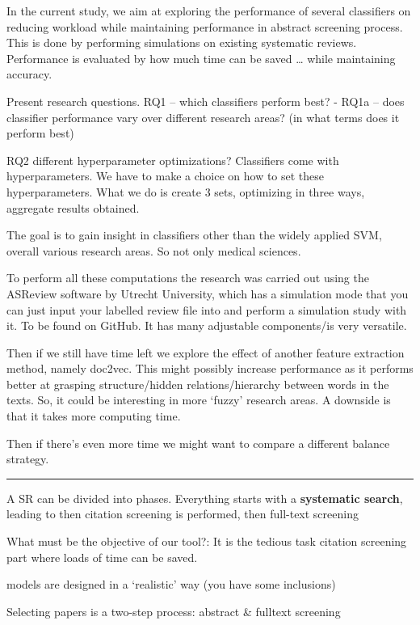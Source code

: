\documentclass[
]{article}
\begin{document}
In the current study, we aim at exploring the performance of several
classifiers on reducing workload while maintaining performance in
abstract screening process. This is done by performing simulations on
existing systematic reviews. Performance is evaluated by how much time
can be saved \ldots{} while maintaining accuracy.

Present research questions. RQ1 -- which classifiers perform best? -
RQ1a -- does classifier performance vary over different research areas?
(in what terms does it perform best)

RQ2 different hyperparameter optimizations? Classifiers come with
hyperparameters. We have to make a choice on how to set these
hyperparameters. What we do is create 3 sets, optimizing in three ways,
aggregate results obtained.

The goal is to gain insight in classifiers other than the widely applied
SVM, overall various research areas. So not only medical sciences.

To perform all these computations the research was carried out using the
ASReview software by Utrecht University, which has a simulation mode
that you can just input your labelled review file into and perform a
simulation study with it. To be found on GitHub. It has many adjustable
components/is very versatile.

Then if we still have time left we explore the effect of another feature
extraction method, namely doc2vec. This might possibly increase
performance as it performs better at grasping structure/hidden
relations/hierarchy between words in the texts. So, it could be
interesting in more `fuzzy' research areas. A downside is that it takes
more computing time.

Then if there's even more time we might want to compare a different
balance strategy.

\begin{center}\rule{0.5\linewidth}{0.5pt}\end{center}

A SR can be divided into phases. Everything starts with a
\textbf{systematic search}, leading to then citation screening is
performed, then full-text screening \autocite{PRISMA-PGroup2015}

What must be the objective of our tool?: It is the tedious task citation
screening part where loads of time can be saved.

models are designed in a `realistic' way (you have some inclusions)

Selecting papers is a two-step process: abstract \& fulltext screening
\end{document}
